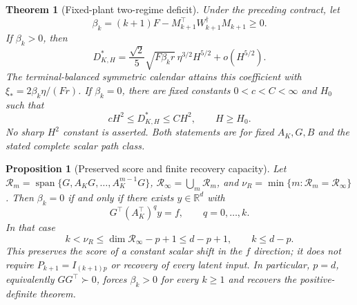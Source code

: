 \documentclass[11pt]{article}
\newtheorem{theorem}{Theorem}
\newtheorem{proposition}{Proposition}
\begin{document}
\begin{theorem}[Fixed-plant two-regime deficit]\label{m2sreg:theorem}
Under the preceding contract, let
\[
\beta_k=(k+1)F-M_{k+1}^\top W_{k+1}^\dagger M_{k+1}\ge0.
\]
If $\beta_k>0$, then
\begin{equation}\label{m2sreg:positive}
D_{K,H}^*=\frac{\sqrt2}{5}\sqrt{F\beta_k r}\,
 \eta^{3/2}H^{5/2}+o(H^{5/2}).
\end{equation}
The terminal-balanced symmetric calendar attains this coefficient with
$\xi_*=2\beta_k\eta/(Fr)$.
If $\beta_k=0$, there are fixed constants $0<c<C<\infty$ and $H_0$
such that
\begin{equation}\label{m2sreg:zero}
cH^2\le D_{K,H}^*\le CH^2,\qquad H\ge H_0 .
\end{equation}
No sharp $H^2$ constant is asserted. Both statements are for fixed
$A_K,G,B$ and the stated complete scalar path class.
\end{theorem}

\begin{proposition}[Preserved score and finite recovery capacity]
\label{m2sreg:capacity}
Let $\mathcal R_m=\operatorname{span}\{G,A_KG,\ldots,A_K^{m-1}G\}$,
$\mathcal R_\infty=\bigcup_m\mathcal R_m$, and
$\nu_R=\min\{m:\mathcal R_m=\mathcal R_\infty\}$.
Then $\beta_k=0$ if and only if there exists $y\in\mathbb R^d$ with
\begin{equation}\label{m2sreg:score}
G^\top(A_K^\top)^q y=f,\qquad q=0,\ldots,k.
\end{equation}
In that case
\begin{equation}\label{m2sreg:dimension}
k<\nu_R\le\dim\mathcal R_\infty-p+1\le d-p+1,
\qquad k\le d-p.
\end{equation}
This preserves the score of a constant scalar shift in the $f$ direction;
it does not require $P_{k+1}=I_{(k+1)p}$ or recovery of every latent input.
In particular, $p=d$, equivalently $GG^\top\succ0$, forces
$\beta_k>0$ for every $k\ge1$ and recovers the positive-definite theorem.
\end{proposition}
\end{document}

